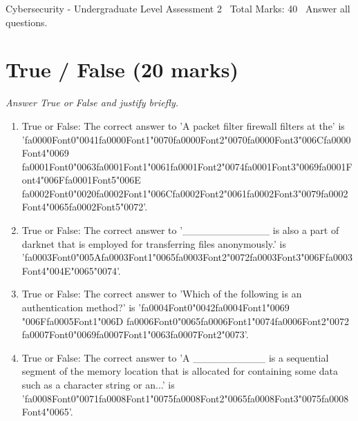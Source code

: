 \documentclass[12pt]{article}
\begin{document}
\begin{center}
Cybersecurity - Undergraduate Level Assessment 2 \
Total Marks: 40 \
Answer all questions.
\end{center}

\section*{True / False (20 marks)}
\textit{Answer True or False and justify briefly.}
\begin{enumerate}[label=\arabic*.]
\item True or False: The correct answer to 'A packet filter firewall filters at the' is '{\csname fa0000Font0\endcsname\char"0041}{\csname fa0000Font1\endcsname\char"0070}{\csname fa0000Font2\endcsname\char"0070}{\csname fa0000Font3\endcsname\char"006C}{\csname fa0000Font4\endcsname\char"0069} {\csname fa0001Font0\endcsname\char"0063}{\csname fa0001Font1\endcsname\char"0061}{\csname fa0001Font2\endcsname\char"0074}{\csname fa0001Font3\endcsname\char"0069}{\csname fa0001Font4\endcsname\char"006F}{\csname fa0001Font5\endcsname\char"006E} {\csname fa0002Font0\endcsname\char"0020}{\csname fa0002Font1\endcsname\char"006C}{\csname fa0002Font2\endcsname\char"0061}{\csname fa0002Font3\endcsname\char"0079}{\csname fa0002Font4\endcsname\char"0065}{\csname fa0002Font5\endcsname\char"0072}'.
\item True or False: The correct answer to '\_\_\_\_\_\_\_\_\_\_\_\_ is also a part of darknet that is employed for transferring files anonymously.' is '{\csname fa0003Font0\endcsname\char"005A}{\csname fa0003Font1\endcsname\char"0065}{\csname fa0003Font2\endcsname\char"0072}{\csname fa0003Font3\endcsname\char"006F}{\csname fa0003Font4\endcsname\char"004E}{\char"0065}{\char"0074}'.
\item True or False: The correct answer to 'Which of the following is an authentication method?' is '{\csname fa0004Font0\endcsname\char"0042}{\csname fa0004Font1\endcsname\char"0069} {\char"006F}{\csname fa0005Font1\endcsname\char"006D} {\csname fa0006Font0\endcsname\char"0065}{\csname fa0006Font1\endcsname\char"0074}{\csname fa0006Font2\endcsname\char"0072} {\csname fa0007Font0\endcsname\char"0069}{\csname fa0007Font1\endcsname\char"0063}{\csname fa0007Font2\endcsname\char"0073}'.
\item True or False: The correct answer to 'A \_\_\_\_\_\_\_\_\_\_ is a sequential segment of the memory location that is allocated for containing some data such as a character string or an...' is '{\csname fa0008Font0\endcsname\char"0071}{\csname fa0008Font1\endcsname\char"0075}{\csname fa0008Font2\endcsname\char"0065}{\csname fa0008Font3\endcsname\char"0075}{\csname fa0008Font4\endcsname\char"0065}'.

\end{enumerate}
\end{document}
